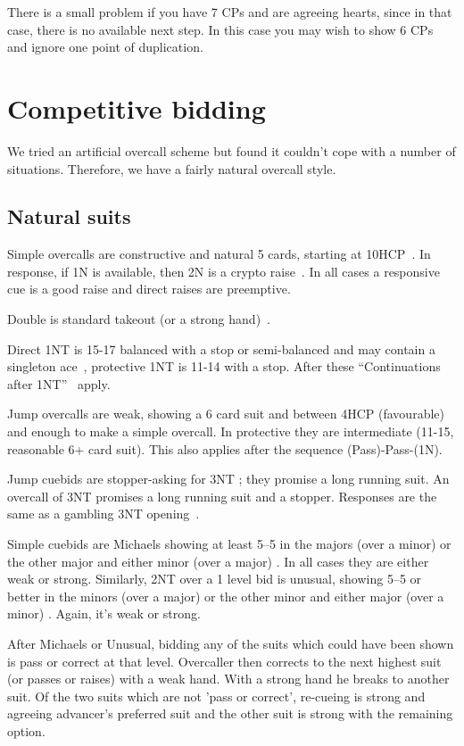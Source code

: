 \documentclass[a4paper,14pt]{extarticle}
\begin{document}
There is a small problem if you have 7 CPs and are agreeing hearts, since in
that case, there is no available next step. In this case you may wish to show
6 CPs and ignore one point of duplication.

\newpage

\section{Competitive bidding}
\label{sec:competitive}

We tried an artificial overcall scheme but found it couldn't cope with a number of situations.
Therefore, we have a fairly natural overcall style.

\subsection{Natural suits}
\label{sec:def:1x}

Simple overcalls are constructive and natural 5 cards, starting at
10HCP~. In response, if 1N is available, then 2N is a crypto
raise~. In all cases a responsive cue is a good raise and
direct raises are preemptive.

Double is standard takeout (or a strong hand)~.

Direct 1NT is 15-17 balanced with a stop or semi-balanced and may contain a
singleton ace~, protective 1NT is 11-14 with a stop. 
After these ``Continuations after 1NT''~ apply. 

Jump overcalls are weak, showing a 6 card suit and between 4HCP (favourable)
and enough to make a simple overcall. In protective they are intermediate
(11-15, reasonable 6+ card suit). This also applies after the sequence (Pass)-Pass-(1N).

Jump cuebids are stopper-asking for 3NT ; they promise a long
running suit.  An overcall of 3NT promises a long running suit and a stopper.
Responses are the same as a gambling 3NT opening~.


Simple cuebids are Michaels showing at least 5--5 in the majors (over a minor)
or the other major and either minor (over a major) . In all cases they are
either weak or strong. Similarly, 2NT over a 1 level bid is unusual, showing
5--5 or better in the minors (over a major) or the other minor and either major
(over a minor) . Again, it's weak or strong.

After Michaels or Unusual, bidding any of the suits which could have been shown
is pass or correct at that level. Overcaller then corrects to the next highest
suit (or passes or raises) with a weak hand. With a strong hand he breaks to
another suit. Of the two suits which are not 'pass or correct', re-cueing is
strong and agreeing advancer's preferred suit and the other suit is strong with
the remaining option.
\end{document}
